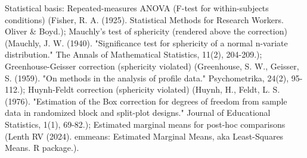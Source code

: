 \documentclass{article}
\begin{document}
Statistical basis: Repeated-measures ANOVA (F-test for within-subjects conditions) (Fisher, R. A. (1925). Statistical Methods for Research Workers. Oliver \& Boyd.); Mauchly's test of sphericity (rendered above the correction) (Mauchly, J. W. (1940). "Significance test for sphericity of a normal n-variate distribution." The Annals of Mathematical Statistics, 11(2), 204-209.); Greenhouse-Geisser correction (sphericity violated) (Greenhouse, S. W., Geisser, S. (1959). "On methods in the analysis of profile data." Psychometrika, 24(2), 95-112.); Huynh-Feldt correction (sphericity violated) (Huynh, H., Feldt, L. S. (1976). "Estimation of the Box correction for degrees of freedom from sample data in randomized block and split-plot designs." Journal of Educational Statistics, 1(1), 69-82.); Estimated marginal means for post-hoc comparisons (Lenth RV (2024). emmeans: Estimated Marginal Means, aka Least-Squares Means. R package.).
\end{document}
